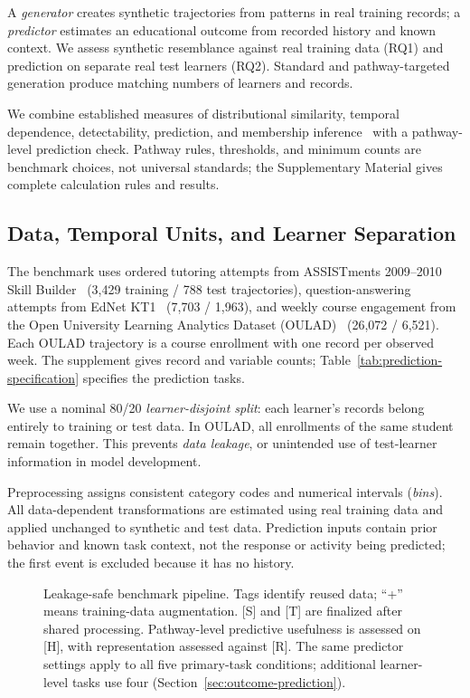\documentclass[fleqn,10pt]{JLA_article}
\begin{document}
A \emph{generator} creates synthetic trajectories from patterns in real training records; a \emph{predictor} estimates an educational outcome from recorded history and known context. We assess synthetic resemblance against real training data (RQ1) and prediction on separate real test learners (RQ2). Standard and pathway-targeted generation produce matching numbers of learners and records.

We combine established measures of distributional similarity, temporal dependence, detectability, prediction, and membership inference~\cite{lin1991divergence,strehl2002cluster,lopezpaz2017c2st,davis2006precision,fawcett2006roc,saito2015precision,shokri2017membership} with a pathway-level prediction check. Pathway rules, thresholds, and minimum counts are benchmark choices, not universal standards; the Supplementary Material gives complete calculation rules and results.


\subsection{Data, Temporal Units, and Learner Separation}

The benchmark uses ordered tutoring attempts from ASSISTments 2009--2010 Skill Builder~\cite{feng2009assistments} (3{,}429 training / 788 test trajectories), question-answering attempts from EdNet KT1~\cite{choi2020ednet} (7{,}703 / 1{,}963), and weekly course engagement from the Open University Learning Analytics Dataset (OULAD)~\cite{kuzilek2017oulad} (26{,}072 / 6{,}521). Each OULAD trajectory is a course enrollment with one record per observed week. The supplement gives record and variable counts; Table~\ref{tab:prediction-specification} specifies the prediction tasks.

We use a nominal 80/20 \emph{learner-disjoint split}: each learner's records belong entirely to training or test data. In OULAD, all enrollments of the same student remain together. This prevents \emph{data leakage}, or unintended use of test-learner information in model development.

Preprocessing assigns consistent category codes and numerical intervals (\emph{bins}). All data-dependent transformations are estimated using real training data and applied unchanged to synthetic and test data. Prediction inputs contain prior behavior and known task context, not the response or activity being predicted; the first event is excluded because it has no history.

\begin{figure}[!htbp]
\centering

\vspace{2pt}
\caption{Leakage-safe benchmark pipeline. Tags identify reused data; ``+'' means training-data augmentation. [S] and [T] are finalized after shared processing. Pathway-level predictive usefulness is assessed on [H], with representation assessed against [R]. The same predictor settings apply to all five primary-task conditions; additional learner-level tasks use four (Section~\ref{sec:outcome-prediction}).}
\label{fig:pipeline}
\end{figure}
\end{document}
